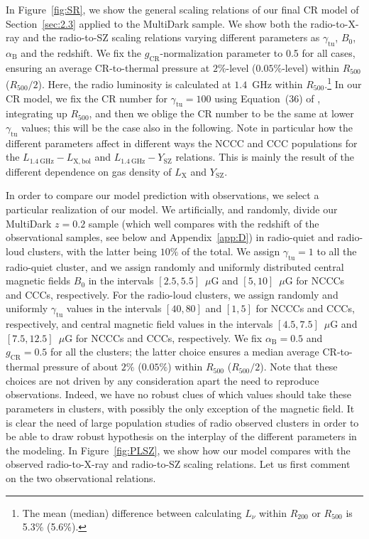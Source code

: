 \documentclass[traditabstract]{aa}
\newcommand{\rmn}{\mathrm}
\begin{document}
In Figure~\ref{fig:SR}, we show the general scaling relations of our final CR model of Section~\ref{sec:2.3} applied to the MultiDark sample. We show both the radio-to-X-ray  and the radio-to-SZ scaling relations varying different parameters as $\gamma_{\rmn{tu}}$, $B_{0}$, $\alpha_{\rmn{B}}$ and the redshift. We fix the $g_{\rmn{CR}}$-normalization parameter to 0.5 for all cases, ensuring an average CR-to-thermal pressure at $2\%$-level ($0.05\%$-level) within $R_{500}$ ($R_{500}/2$). Here, the radio luminosity is calculated at $1.4$~GHz within $R_{500}.$\footnote[14]{The mean (median) difference between calculating $L_{\nu}$ within $R_{200}$ or $R_{500}$ is 5.3\% (5.6\%).} In our CR model, we fix the CR number for $\gamma_{\rmn{tu}}=100$ using Equation~(36) of \cite{2011A&A...527A..99E}, integrating up $R_{500}$, and then we oblige the CR number to be the same at lower $\gamma_{\rmn{tu}}$ values; this will be the case also in the following. Note in particular how the different parameters affect in different ways the NCCC and CCC populations for the $L_{1.4~\rmn{GHz}}-L_{\rmn{X,bol}}$ and $L_{1.4~\rmn{GHz}}-Y_{\rmn{SZ}}$ relations. This is mainly the result of the different dependence on gas density of $L_{\rmn{X}}$ and $Y_{\rmn{SZ}}$.

In order to compare our model prediction with observations, we select a particular realization of our model. We artificially, and randomly, divide our MultiDark $z=0.2$ sample (which well compares with the redshift of the observational samples, see below and Appendix~\ref{app:D}) in radio-quiet and radio-loud clusters, with the latter being $10\%$ of the total. We assign $\gamma_{\rmn{tu}}=1$ to all the radio-quiet cluster, and we assign randomly and uniformly distributed central magnetic fields $B_0$ in the intervals $[2.5,5.5]$~$\mu$G and $[5,10]$~$\mu$G for NCCCs and CCCs, respectively. For the radio-loud clusters, we assign randomly and uniformly $\gamma_{\rmn{tu}}$ values in the intervals $[40,80]$ and $[1,5]$ for NCCCs and CCCs, respectively, and central magnetic field values in the intervals $[4.5,7.5]$~$\mu$G and $[7.5,12.5]$~$\mu$G for NCCCs and CCCs, respectively. We fix $\alpha_{\rmn{B}}=0.5$ and $g_{\rmn{CR}}=0.5$ for all the clusters; the latter choice ensures a median average CR-to-thermal pressure of about $2\%$ ($0.05\%$) within $R_{500}$ ($R_{500}/2$). Note that these choices are not driven by any consideration apart the need to reproduce observations. Indeed, we have no robust clues of which values should take these parameters in clusters, with possibly the only exception of the magnetic field. It is clear the need of large population studies of radio observed clusters in order to be able to draw robust hypothesis on the interplay of the different parameters in the modeling. In Figure~\ref{fig:PLSZ}, we show how our model compares with the observed radio-to-X-ray and radio-to-SZ scaling relations. Let us first comment on the two observational relations.
 
\end{document}
